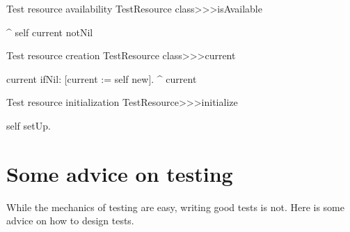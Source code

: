 \documentclass[a4paper,10pt,twoside]{book}
\begin{document}
{
\begin{method}[testresourceisavailable]{Test resource availability}
TestResource class>>>isAvailable

	^ self current notNil
\end{method}
\begin{method}[testresourcecurrent]{Test resource creation}
TestResource class>>>current

	current ifNil: [current := self new].
	^ current
\end{method}
\begin{method}[restresourceinitialize]{Test resource initialization}
TestResource>>>initialize

	self setUp.
\end{method}
\section{Some advice on testing}

While the mechanics of testing are easy, writing good tests is not.
Here is some advice on how to design tests.

\begin{description}



\end{description}}
\end{document}
